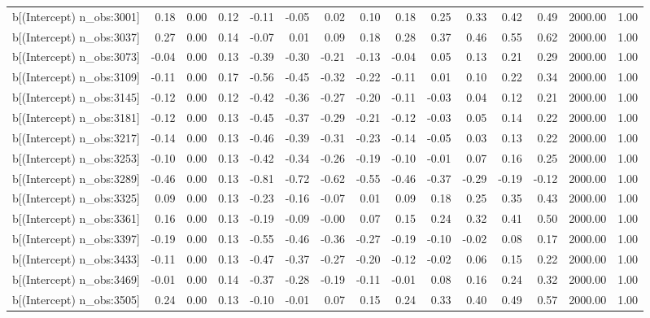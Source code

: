 \begin{table}[ht]
\begin{tabular}{rrrrrrrrrrrrrrr}
  b[(Intercept) n\_obs:3001] & 0.18 & 0.00 & 0.12 & -0.11 & -0.05 & 0.02 & 0.10 & 0.18 & 0.25 & 0.33 & 0.42 & 0.49 & 2000.00 & 1.00 \\ 
  b[(Intercept) n\_obs:3037] & 0.27 & 0.00 & 0.14 & -0.07 & 0.01 & 0.09 & 0.18 & 0.28 & 0.37 & 0.46 & 0.55 & 0.62 & 2000.00 & 1.00 \\ 
  b[(Intercept) n\_obs:3073] & -0.04 & 0.00 & 0.13 & -0.39 & -0.30 & -0.21 & -0.13 & -0.04 & 0.05 & 0.13 & 0.21 & 0.29 & 2000.00 & 1.00 \\ 
  b[(Intercept) n\_obs:3109] & -0.11 & 0.00 & 0.17 & -0.56 & -0.45 & -0.32 & -0.22 & -0.11 & 0.01 & 0.10 & 0.22 & 0.34 & 2000.00 & 1.00 \\ 
  b[(Intercept) n\_obs:3145] & -0.12 & 0.00 & 0.12 & -0.42 & -0.36 & -0.27 & -0.20 & -0.11 & -0.03 & 0.04 & 0.12 & 0.21 & 2000.00 & 1.00 \\ 
  b[(Intercept) n\_obs:3181] & -0.12 & 0.00 & 0.13 & -0.45 & -0.37 & -0.29 & -0.21 & -0.12 & -0.03 & 0.05 & 0.14 & 0.22 & 2000.00 & 1.00 \\ 
  b[(Intercept) n\_obs:3217] & -0.14 & 0.00 & 0.13 & -0.46 & -0.39 & -0.31 & -0.23 & -0.14 & -0.05 & 0.03 & 0.13 & 0.22 & 2000.00 & 1.00 \\ 
  b[(Intercept) n\_obs:3253] & -0.10 & 0.00 & 0.13 & -0.42 & -0.34 & -0.26 & -0.19 & -0.10 & -0.01 & 0.07 & 0.16 & 0.25 & 2000.00 & 1.00 \\ 
  b[(Intercept) n\_obs:3289] & -0.46 & 0.00 & 0.13 & -0.81 & -0.72 & -0.62 & -0.55 & -0.46 & -0.37 & -0.29 & -0.19 & -0.12 & 2000.00 & 1.00 \\ 
  b[(Intercept) n\_obs:3325] & 0.09 & 0.00 & 0.13 & -0.23 & -0.16 & -0.07 & 0.01 & 0.09 & 0.18 & 0.25 & 0.35 & 0.43 & 2000.00 & 1.00 \\ 
  b[(Intercept) n\_obs:3361] & 0.16 & 0.00 & 0.13 & -0.19 & -0.09 & -0.00 & 0.07 & 0.15 & 0.24 & 0.32 & 0.41 & 0.50 & 2000.00 & 1.00 \\ 
  b[(Intercept) n\_obs:3397] & -0.19 & 0.00 & 0.13 & -0.55 & -0.46 & -0.36 & -0.27 & -0.19 & -0.10 & -0.02 & 0.08 & 0.17 & 2000.00 & 1.00 \\ 
  b[(Intercept) n\_obs:3433] & -0.11 & 0.00 & 0.13 & -0.47 & -0.37 & -0.27 & -0.20 & -0.12 & -0.02 & 0.06 & 0.15 & 0.22 & 2000.00 & 1.00 \\ 
  b[(Intercept) n\_obs:3469] & -0.01 & 0.00 & 0.14 & -0.37 & -0.28 & -0.19 & -0.11 & -0.01 & 0.08 & 0.16 & 0.24 & 0.32 & 2000.00 & 1.00 \\ 
  b[(Intercept) n\_obs:3505] & 0.24 & 0.00 & 0.13 & -0.10 & -0.01 & 0.07 & 0.15 & 0.24 & 0.33 & 0.40 & 0.49 & 0.57 & 2000.00 & 1.00 \\ 

\end{tabular}
\end{table}
